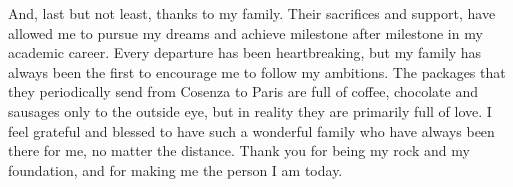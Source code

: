And, last but not least, thanks to my family. Their sacrifices and support, have allowed me to pursue my dreams and achieve milestone after milestone in my academic career. Every departure has been heartbreaking, but my family has always been the first to encourage me to follow my ambitions. The packages that they periodically send from Cosenza to Paris are full of coffee, chocolate and sausages only to the outside eye, but in reality they are primarily full of love. I feel grateful and blessed to have such a wonderful family who have always been there for me, no matter the distance. Thank you for being my rock and my foundation, and for making me the person I am today. 